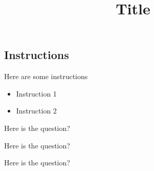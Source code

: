 \documentclass[twoside,showAnswers,2columns]{Exam} %
\title{Title}
\begin{document}

	\begin{framed}
		\section*{Instructions}
			Here are some instructions
			\begin{itemize}
				\item Instruction 1
				\item Instruction 2
			\end{itemize}

	\end{framed}

\begin{question}
Here is the question?
\end{question}

\begin{question}
Here is the question?
\end{question}

\begin{question}
Here is the question?
\end{question}
\end{document}
